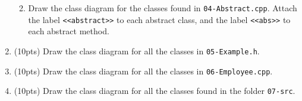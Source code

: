 \documentclass[11pt]{article}
\begin{document}
\begin{enumerate}
\begin{enumerate}
    \vfill

    \item Draw the class diagram for the classes found in \texttt{04-Abstract.cpp}. Attach the label \texttt{<<abstract>>} to each abstract class, and the label \texttt{<<abs>>} to each abstract method.

    \vfill
    \vfill
    \vfill
    \vfill
    \vfill

  \end{enumerate}

\newpage






  \item (10pts) Draw the class diagram for all the classes in \texttt{05-Example.h}.

  \vfill
  \vfill

  \item (10pts) Draw the class diagram for all the classes in \texttt{06-Employee.cpp}.

  \vfill
  \vfill
  \vfill

\newpage

  \item (10pts) Draw the class diagram for all the classes found in the folder \texttt{07-src}.


\end{enumerate}
\end{document}
